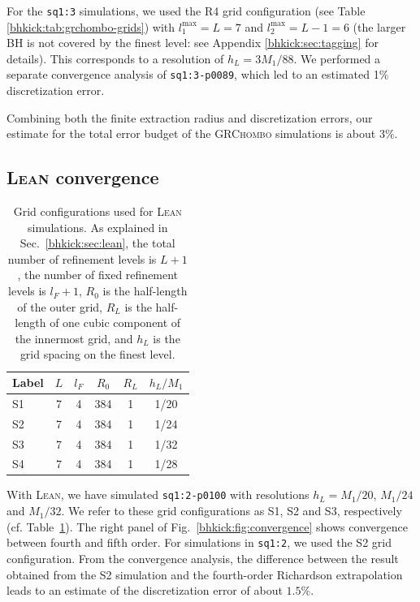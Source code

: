For the \texttt{sq1:3} simulations, we used the R4 grid configuration
(see Table \ref{bhkick:tab:grchombo-grids}) with $l_1^{\max}=L=7$ and
$l_2^{\max}=L-1=6$ (the larger BH is not covered by the finest level:
see Appendix \ref{bhkick:sec:tagging} for details). This corresponds to a
resolution of $h_L=3M_1/88$. We performed a separate convergence
analysis of \texttt{sq1:3-p0089}, which led to an estimated 1\%
discretization error.

Combining both the finite extraction radius and discretization errors, 
our estimate for the total error budget of the \textsc{GRChombo} 
simulations is about $3\%$.


\subsection{\textsc{Lean} convergence}
\begin{table}[b]
    {
    \caption{Grid configurations used for \textsc{Lean} simulations. As 
    explained in Sec.~\ref{bhkick:sec:lean}, the total number of refinement 
    levels is $L+1$, the number of fixed refinement levels is $l_F+1$, 
    $R_0$ is the half-length of the outer grid, $R_L$ is the half-length 
    of one cubic component of the innermost grid, and $h_L$ is the grid 
    spacing on the finest level.}
    \centering
    \begin{tabular}{lccccc} \hline
        Label & $L$ & $l_F$ & $R_0$ & $R_L$ & $h_L/M_1$\\
        \hline
        S1 & 7 & 4 & 384 & 1 & 1/20\\
        S2 & 7 & 4 & 384 & 1 & 1/24\\
        S3 & 7 & 4 & 384 & 1 & 1/32\\
        S4 & 7 & 4 & 384 & 1 & 1/28\\ \hline
    \end{tabular}
    }
    \label{bhkick:tab:lean-grids}
\end{table}

With \textsc{Lean}, we have simulated \texttt{sq1:2-p0100} with
resolutions $h_L = M_1/20$, $M_1/24$ and $M_1/32$. We refer to these
grid configurations as S1, S2 and S3, respectively
(cf. Table~\ref{bhkick:tab:lean-grids}). The right panel of Fig.~\ref{bhkick:fig:convergence}
shows convergence between fourth and fifth order. For simulations in
\texttt{sq1:2}, we used the S2 grid configuration. From the
convergence analysis, the difference between the result obtained from
the S2 simulation and the fourth-order Richardson extrapolation leads
to an estimate of the discretization error of about $1.5\%$.

